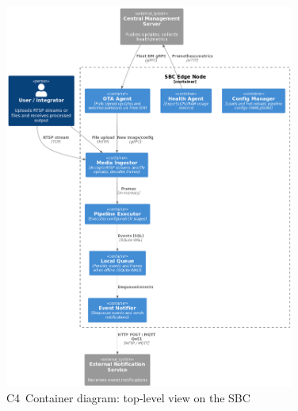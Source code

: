 \documentclass[11pt,a4paper]{article}
\begin{document}
\begin{figure}[H]
  \centering
  \includegraphics[width=0.85\textwidth]{fig/container_diagram.png}
  \caption{C4 Container diagram: top‑level view on the SBC}
  \label{fig:container}
\end{figure}
\end{document}
